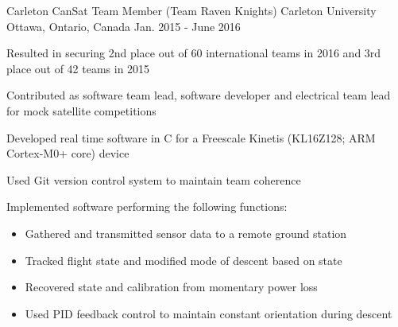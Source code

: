 

\begin{cventries}

  \cventry
    {Carleton CanSat Team Member (Team Raven Knights)} %
    {Carleton University} %
    {Ottawa, Ontario, Canada} %
    {Jan. 2015 - June 2016} %
    {
      \begin{cvitems} %
        \item {Resulted in securing 2nd place out of 60 international teams in 2016 and 3rd place out of 42 teams in 2015}
        \item {Contributed as software team lead, software developer and electrical team lead for mock satellite competitions}
        \item {Developed real time software in C for a Freescale Kinetis (KL16Z128; ARM Cortex-M0+ core) device}
        \item {Used Git version control system to maintain team coherence}
        \item {Implemented software performing the following functions:}
        \begin{itemize}
          \item {Gathered and transmitted sensor data to a remote ground station}
          \item {Tracked flight state and modified mode of descent based on state}
          \item {Recovered state and calibration from momentary power loss}
          \item {Used PID feedback control to maintain constant orientation during descent}
        \end{itemize}
      \end{cvitems}
    }

\end{cventries}

